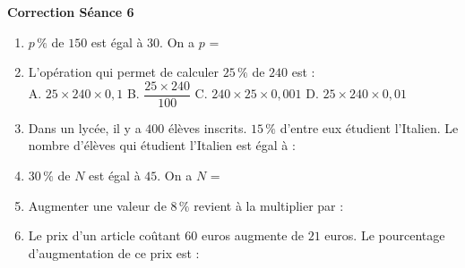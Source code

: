 \documentclass[a4paper,11pt]{article}
\begin{document}
\begin{center}

\textbf{\textcolor{Couleur8}{Correction Séance 6}}\\
\vspace{2mm}

\end{center}
\newpage

\vspace*{1cm}
\begin{seance}{} %

\begin{enumerate}
\item $p\,\%$ de $150$ est égal à $30$. On a $p$ = \dotfill

\item L'opération qui permet de calculer $25\,\%$ de $240$ est : \\
A. $25 \times 240 \times 0{,}1$ \quad B. $\dfrac{25 \times 240}{100}$ \quad C. $240 \times 25 \times 0{,}001$ \quad D. $25 \times 240 \times 0{,}01$\dotfill

\item Dans un lycée, il y a $400$ élèves inscrits. $15\,\%$ d'entre eux étudient l'Italien.
Le nombre d'élèves qui étudient l'Italien est égal à : \dotfill

\item $30\,\%$ de $N$ est égal à $45$. On a $N$ = \dotfill

\item Augmenter une valeur de $8\,\%$ revient à la multiplier par : \dotfill

\item Le prix d'un article coûtant $60$ euros augmente de $21$ euros.
Le pourcentage d'augmentation de ce prix est : \dotfill

\end{enumerate}

\end{seance}
\end{document}
